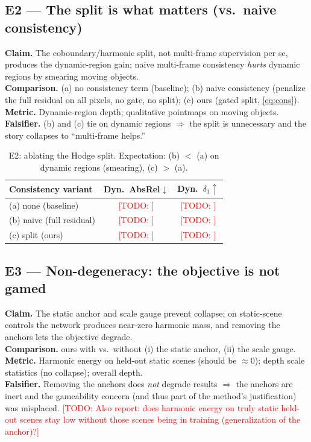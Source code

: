 \documentclass{article}
\newcommand{\todo}[1]{\textcolor{red}{[TODO: #1]}}
\theoremstyle{definition}
\theoremstyle{plain}
\theoremstyle{remark}
\begin{document}
\subsection{E2 --- The split is what matters (vs.\ naive consistency)}
\label{sec:e2}
\textbf{Claim.} The coboundary/harmonic split, not multi-frame
supervision per se, produces the dynamic-region gain; naive multi-frame
consistency \emph{hurts} dynamic regions by smearing moving objects.\\
\textbf{Comparison.} (a) no consistency term (baseline); (b) naive
consistency (penalize the full residual on all pixels, no gate, no split);
(c) ours (gated split, \eqref{eq:cons}).\\
\textbf{Metric.} Dynamic-region depth; qualitative pointmaps on moving
objects.\\
\textbf{Falsifier.} (b) and (c) tie on dynamic regions $\Rightarrow$ the
split is unnecessary and the story collapses to ``multi-frame helps.''

\begin{table}[h]
\centering
\begin{tabular}{lcc}
\toprule
Consistency variant & Dyn.\ AbsRel$\downarrow$ & Dyn.\ $\delta_1\uparrow$ \\
\midrule
(a) none (baseline)        & \todo{} & \todo{} \\
(b) naive (full residual)  & \todo{} & \todo{} \\
(c) split (ours)           & \todo{} & \todo{} \\
\bottomrule
\end{tabular}
\caption{E2: ablating the Hodge split. Expectation: (b) $<$ (a) on dynamic
regions (smearing), (c) $>$ (a).}
\label{tab:e2}
\end{table}

\subsection{E3 --- Non-degeneracy: the objective is not gamed}
\label{sec:e3}
\textbf{Claim.} The static anchor and scale gauge prevent collapse; on
static-scene controls the network produces near-zero harmonic mass, and
removing the anchors lets the objective degrade.\\
\textbf{Comparison.} ours with vs.\ without (i) the static anchor, (ii)
the scale gauge.\\
\textbf{Metric.} Harmonic energy on held-out static scenes (should be
$\approx 0$); depth scale statistics (no collapse); overall depth.\\
\textbf{Falsifier.} Removing the anchors does \emph{not} degrade results
$\Rightarrow$ the anchors are inert and the gameability concern (and thus
part of the method's justification) was misplaced.
\todo{Also report: does harmonic energy on truly static held-out scenes
stay low without those scenes being in training (generalization of the
anchor)?}
\end{document}
